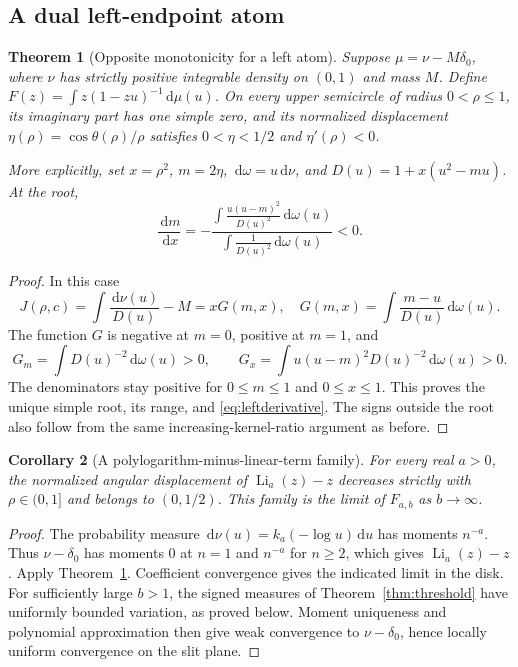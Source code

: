 \documentclass[11pt]{article}
\numberwithin{equation}{section}
\newtheorem{theorem}{Theorem}[section]
\newtheorem{corollary}[theorem]{Corollary}
\theoremstyle{definition}\newtheorem{definition}[theorem]{Definition}
\theoremstyle{remark}\newtheorem{remark}[theorem]{Remark}
\newcommand{\dd}{\,\mathrm d}
\DeclareMathOperator{\Li}{Li}
\begin{document}
\subsection{A dual left-endpoint atom}
\begin{theorem}[Opposite monotonicity for a left atom]\label{thm:left}
Suppose $\mu=\nu-M\delta_0$, where $\nu$ has strictly positive
integrable density on $(0,1)$ and mass $M$. Define
$F(z)=\int z(1-zu)^{-1}\dd\mu(u)$.
On every upper semicircle of radius $0<\rho\le1$, its imaginary
part has one simple zero, and its normalized displacement
$\eta(\rho)=\cos\theta(\rho)/\rho$ satisfies
$0<\eta<1/2$ and $\eta'(\rho)<0$.

More explicitly, set $x=\rho^2$, $m=2\eta$, $\dd\omega=u\dd\nu$,
and $D(u)=1+x(u^2-mu)$. At the root,
\begin{equation}\label{eq:leftderivative}
 \frac{\dd m}{\dd x}
 =-\frac{\displaystyle\int\frac{u(u-m)^2}{D(u)^2}\dd\omega(u)}
 {\displaystyle\int\frac1{D(u)^2}\dd\omega(u)}<0.
\end{equation}
\end{theorem}
\begin{proof}
In this case
\[
 J(\rho,c)=\int\frac{\dd\nu(u)}{D(u)}-M=xG(m,x),
 \quad
 G(m,x)=\int\frac{m-u}{D(u)}\dd\omega(u).
\]
The function $G$ is negative at $m=0$, positive at $m=1$, and
\[
 G_m=\int D(u)^{-2}\dd\omega(u)>0,
 \qquad
 G_x=\int u(u-m)^2D(u)^{-2}\dd\omega(u)>0.
\]
The denominators stay positive for $0\le m\le1$ and $0\le x\le1$.
This proves the unique simple root, its range, and
\eqref{eq:leftderivative}. The signs outside the root also follow
from the same increasing-kernel-ratio argument as before.
\end{proof}

\begin{corollary}[A polylogarithm-minus-linear-term family]\label{cor:Li}
For every real $a>0$, the normalized angular displacement of
$\Li_a(z)-z$ decreases strictly with $\rho\in(0,1]$ and belongs to
$(0,1/2)$. This family is the limit of $F_{a,b}$ as $b\to\infty$.
\end{corollary}
\begin{proof}
The probability measure $\dd\nu(u)=k_a(-\log u)\dd u$ has moments
$n^{-a}$. Thus $\nu-\delta_0$ has moments $0$ at $n=1$ and $n^{-a}$
for $n\ge2$, which gives $\Li_a(z)-z$. Apply
Theorem~\ref{thm:left}. Coefficient convergence gives the indicated
limit in the disk. For sufficiently large $b>1$, the signed measures
of Theorem~\ref{thm:threshold} have uniformly bounded variation,
as proved below. Moment uniqueness and polynomial approximation then
give weak convergence to $\nu-\delta_0$, hence locally uniform
convergence on the slit plane.
\end{proof}
\end{document}

